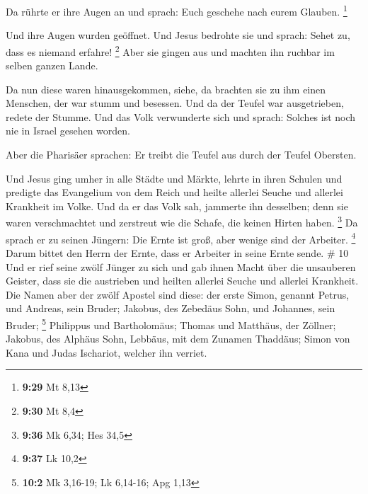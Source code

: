  Da rührte er ihre Augen an und sprach: Euch geschehe
nach eurem Glauben. \footnote{\textbf{9:29} Mt 8,13}

 Und ihre Augen wurden geöffnet. Und Jesus bedrohte sie
und sprach: Sehet zu, dass es niemand erfahre! \footnote{\textbf{9:30}
  Mt 8,4}  Aber sie gingen aus und machten ihn ruchbar im
selben ganzen Lande.

 Da nun diese waren hinausgekommen, siehe, da brachten
sie zu ihm einen Menschen, der war stumm und besessen. 
Und da der Teufel war ausgetrieben, redete der Stumme. Und das Volk
verwunderte sich und sprach: Solches ist noch nie in Israel gesehen
worden.

 Aber die Pharisäer sprachen: Er treibt die Teufel aus
durch der Teufel Obersten.

 Und Jesus ging umher in alle Städte und Märkte, lehrte
in ihren Schulen und predigte das Evangelium von dem Reich und heilte
allerlei Seuche und allerlei Krankheit im Volke.  Und da
er das Volk sah, jammerte ihn desselben; denn sie waren verschmachtet
und zerstreut wie die Schafe, die keinen Hirten haben. \footnote{\textbf{9:36}
  Mk 6,34; Hes 34,5}  Da sprach er zu seinen Jüngern: Die
Ernte ist groß, aber wenige sind der Arbeiter. \footnote{\textbf{9:37}
  Lk 10,2}  Darum bittet den Herrn der Ernte, dass er
Arbeiter in seine Ernte sende. \# 10  Und er rief seine
zwölf Jünger zu sich und gab ihnen Macht über die unsauberen Geister,
dass sie die austrieben und heilten allerlei Seuche und allerlei
Krankheit.  Die Namen aber der zwölf Apostel sind diese:
der erste Simon, genannt Petrus, und Andreas, sein Bruder; Jakobus, des
Zebedäus Sohn, und Johannes, sein Bruder; \footnote{\textbf{10:2} Mk
  3,16-19; Lk 6,14-16; Apg 1,13}  Philippus und
Bartholomäus; Thomas und Matthäus, der Zöllner; Jakobus, des Alphäus
Sohn, Lebbäus, mit dem Zunamen Thaddäus;  Simon von Kana
und Judas Ischariot, welcher ihn verriet.

